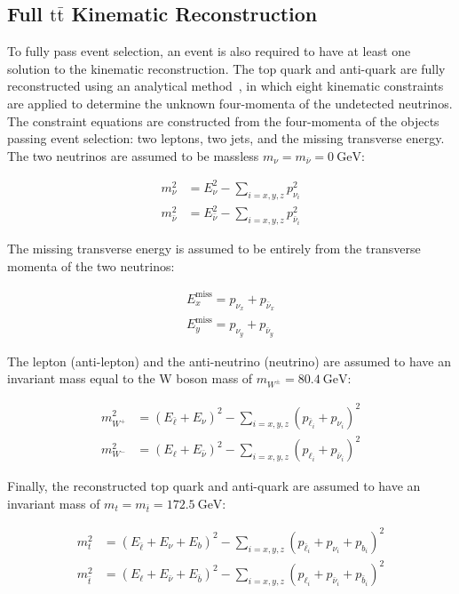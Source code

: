 \subsection{Full \ensuremath{\mathrm{t\bar{t}}} Kinematic Reconstruction}
To fully pass event selection, an event is also required to have at least one solution to the \ttbar kinematic reconstruction.
The top quark and anti-quark are fully reconstructed using an analytical method~\cite{Sonnenschein:2006ud}, in which eight kinematic constraints are applied to determine the unknown four-momenta of the undetected neutrinos.
The constraint equations are constructed from the four-momenta of the objects passing event selection: two leptons, two jets, and the missing transverse energy. 
The two neutrinos are assumed to be massless $m_{\nu} = m_{\bar{\nu}} = \SI{0}{\GeV}$:
\begin{linenomath*}
\begin{align}
m_{\nu}^2 &= E_{\nu}^2 - \sum_{i = x, y, z} p_{\nu_i}^2 \\
m_{\bar{\nu}}^2 &= E_{\bar{\nu}}^2 - \sum_{i = x, y, z} p_{\bar{\nu}_i}^2
\end{align}
\end{linenomath*}
The missing transverse energy is assumed to be entirely from the transverse momenta of the two neutrinos:
\begin{linenomath*}
\begin{align}
E_{x}^{\text{miss}}=p_{\nu_x}+p_{\bar{\nu}_x} \\
E_{y}^{\text{miss}}=p_{\nu_y}+p_{\bar{\nu}_y}
\end{align}
\end{linenomath*}
The lepton (anti-lepton) and the anti-neutrino (neutrino) are assumed to have an invariant mass equal to the W boson mass of $m_{W^\pm} = \SI{80.4}{\GeV}$:
\begin{linenomath*}
\begin{align}
m_{W^{+}}^2 &=\left(E_{\bar{\ell}}+E_\nu\right)^2- \sum_{i = x, y, z} \left(p_{\bar{\ell}_i}+p_{\nu_i}\right)^2  \\
m_{W^{-}}^2 &=\left(E_{\ell}+E_{\bar{\nu}}\right)^2- \sum_{i = x, y, z} \left(p_{\ell_i}+p_{\bar{\nu}_i}\right)^2
\end{align}
\end{linenomath*}
Finally, the reconstructed top quark and anti-quark are assumed to have an invariant mass of $m_{t} = m_{\bar{t}} = \SI{172.5}{\GeV}$:
\begin{linenomath*}
\begin{align}
m_t^2 &= \left(E_{\bar{\ell}}+E_\nu+E_b\right)^2- \sum_{i = x, y, z} \left(p_{\bar{\ell}_i}+p_{\nu_i}+p_{b_i}\right)^2 \\
m_{\bar{t}}^2 &= \left(E_{\ell}+E_{\bar{\nu}}+E_{\bar{b}}\right)^2 - \sum_{i = x, y, z} \left(p_{\ell_i}+p_{\bar{\nu}_i}+p_{\bar{b}_i}\right)^2 
\end{align}
\end{linenomath*}
